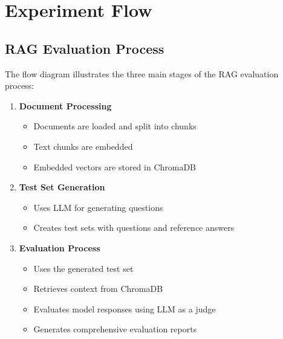 \chapter{Experiment Flow}

\section{RAG Evaluation Process}

The flow diagram illustrates the three main stages of the RAG evaluation process:

\begin{enumerate}
    \item \textbf{Document Processing}
    \begin{itemize}
        \item Documents are loaded and split into chunks
        \item Text chunks are embedded
        \item Embedded vectors are stored in ChromaDB
    \end{itemize}
    
    \item \textbf{Test Set Generation}
    \begin{itemize}
        \item Uses LLM for generating questions
        \item Creates test sets with questions and reference answers
    \end{itemize}
    
    \item \textbf{Evaluation Process}
    \begin{itemize}
        \item Uses the generated test set
        \item Retrieves context from ChromaDB
        \item Evaluates model responses using LLM as a judge
        \item Generates comprehensive evaluation reports
    \end{itemize}
\end{enumerate}

